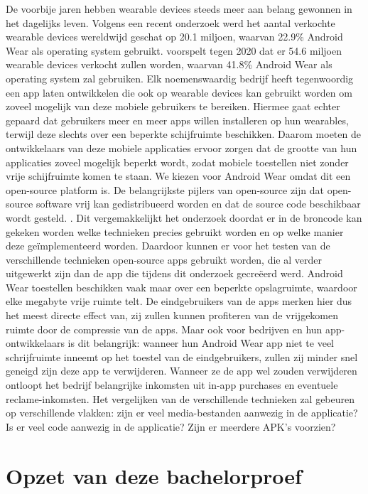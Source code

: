 De voorbije jaren hebben wearable devices steeds meer aan belang gewonnen in het dagelijks leven. Volgens een recent onderzoek werd het aantal verkochte wearable devices wereldwijd geschat op 20.1 miljoen, waarvan 22.9\% Android Wear als operating system gebruikt. \autocite{IDC} voorspelt tegen 2020 dat er 54.6 miljoen wearable devices verkocht zullen worden, waarvan 41.8\% Android Wear als operating system zal gebruiken. Elk noemenswaardig bedrijf heeft tegenwoordig een app laten ontwikkelen die ook op wearable devices kan gebruikt worden om zoveel mogelijk van deze mobiele gebruikers te bereiken. Hiermee gaat echter gepaard dat gebruikers meer en meer apps willen installeren op hun wearables, terwijl deze slechts over een beperkte schijfruimte beschikken. Daarom moeten de ontwikkelaars van deze mobiele applicaties ervoor zorgen dat de grootte van hun applicaties zoveel mogelijk beperkt wordt, zodat mobiele toestellen niet zonder vrije schijfruimte komen te staan. We kiezen voor Android Wear omdat dit een open-source platform is. De belangrijkste pijlers van open-source zijn dat open-source software vrij kan gedistribueerd worden en dat de source code beschikbaar wordt gesteld. \autocite{OpenSourceInitiative}. Dit vergemakkelijkt het onderzoek doordat er in de broncode kan gekeken worden welke technieken precies gebruikt worden en op welke manier deze geïmplementeerd worden. Daardoor kunnen er voor het testen van de verschillende technieken open-source apps gebruikt worden, die al verder uitgewerkt zijn dan de app die tijdens dit onderzoek gecreëerd werd. Android Wear toestellen beschikken vaak maar over een beperkte opslagruimte, waardoor elke megabyte vrije ruimte telt. De eindgebruikers van de apps merken hier dus het meest directe effect van, zij zullen kunnen profiteren van de vrijgekomen ruimte door de compressie van de apps. Maar ook voor bedrijven en hun app-ontwikkelaars is dit belangrijk: wanneer hun Android Wear app niet te veel schrijfruimte inneemt op het toestel van de eindgebruikers, zullen zij minder snel geneigd zijn deze app te verwijderen. Wanneer ze de app wel zouden verwijderen ontloopt het bedrijf belangrijke inkomsten uit in-app purchases en eventuele reclame-inkomsten. Het vergelijken van de verschillende technieken zal gebeuren op verschillende vlakken: zijn er veel media-bestanden aanwezig in de applicatie? Is er veel code aanwezig in de applicatie? Zijn er meerdere APK's voorzien?

\section{Opzet van deze bachelorproef}
\label{sec:opzet-bachelorproef}

